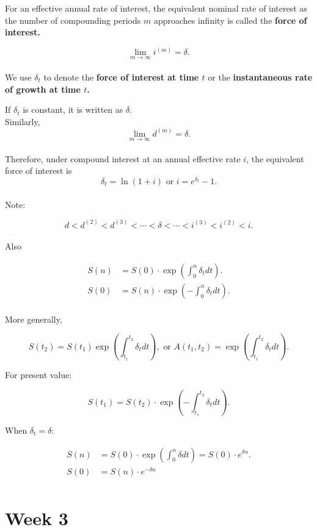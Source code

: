 \documentclass[a4paper, 11pt, twoside]{article}
\begin{document}
For an effective annual rate of interest, the equivalent nominal rate of interest as the number of compounding periods $m$ approaches infinity is called the \textbf{force of interest.}

\[\lim_{m\to\infty}i^{(m)}=\delta.\]\\

We use $\delta_t$ to denote the \textbf{force of interest at time $t$} or the \textbf{instantaneous rate of growth at time $t$.}

If $\delta_t$ is constant, it is written as $\delta.$\\

Similarly, \[\lim_{m\to\infty}d^{(m)}=\delta.\]\\

Therefore, under compound interest at an annual effective rate $i$, the equivalent force of interest is \[\delta_t=\ln(1+i) \text{ or } i=e^{\delta_t}-1.\]\\

Note:

\[d<d^{(2)}<d^{(3)}<\cdots < \delta < \cdots < i^{(3)} < i^{(2)} < i.\]\\

Also

\[
\begin{split}
	S(n) &= S(0) \cdot \exp\left(\int^n_0 \delta_t dt\right).\\
	S(0) &= S(n) \cdot \exp\left(-\int^n_0 \delta_t dt\right).\\
\end{split}
\]

More generally, 

\[S(t_2)=S(t_1)\exp\left(\int^{t_2}_{t_1}\delta_t dt\right), \text{ or } A(t_1,t_2)=\exp\left(\int^{t_2}_{t_1}\delta_t dt \right).\]

For present value:

\[S(t_1) = S(t_2)\cdot \exp\left(-\int^{t_2}_{t_1}\delta_t dt\right).\]

When $\delta_t=\delta$:

\[
\begin{split}
	S(n)&=S(0)\cdot \exp\left(\int^n_0\delta dt\right) = S(0)\cdot e^{\delta n}.\\
	S(0)&=S(n)\cdot e^{-\delta n}\\
\end{split}
\]

\section{Week 3}
\end{document}
